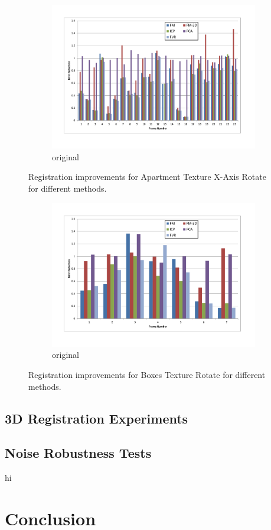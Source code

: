 \begin{figure}[t!] 
        \centering
        \begin{subfigure}[b]{6.0in}
                \includegraphics[width=6.0in]{images/results/Apartment_Texture_Rotate_XAxis}
                \caption{original}
                \label{fig:PEE2}
        \end{subfigure}
       \caption{Registration improvements for Apartment Texture X-Axis Rotate for different methods.}\label{fig:PEE2Fig}
\end{figure}


\begin{figure}[t!] 
        \centering
        \begin{subfigure}[b]{6.0in}
                \includegraphics[width=6.0in]{images/results/Boxes_Texture_Rotate}
                \caption{original}
                \label{fig:PEE3}
        \end{subfigure}
       \caption{Registration improvements for Boxes Texture Rotate for different methods.}\label{fig:PEE3Fig}
\end{figure}

\subsection{3D Registration Experiments}

\subsection{Noise Robustness Tests}

hi


\section{Conclusion}

